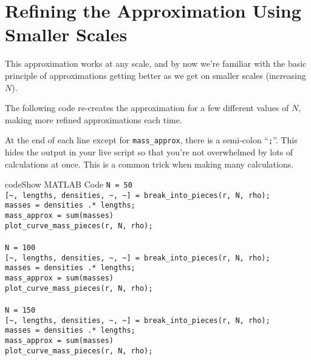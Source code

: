 \documentclass{ximera}
\begin{document}
\section*{Refining the Approximation Using Smaller Scales}

This approximation works at any scale, and by now we're familiar with the basic principle of approximations getting better as we get on smaller scales (increasing $N$).

The following code re-creates the approximation for a few different values of $N$, making more refined approximations each time.

\begin{remark}
At the end of each line except for \texttt{mass\_approx}, there is a semi-colon ``\texttt{;}''. This hides the output in your live script so that you're not overwhelmed by lots of calculations at once. This is a common trick when making many calculations.
\end{remark}

\begin{expandable}{code}{Show MATLAB Code}
\texttt{N = 50}\\
\texttt{[\textasciitilde, lengths, densities, \textasciitilde, \textasciitilde] = break\_into\_pieces(r, N, rho);}\\
\texttt{masses = densities .* lengths;}\\
\texttt{mass\_approx = sum(masses)}\\
\texttt{plot\_curve\_mass\_pieces(r, N, rho);}\\
\\
\texttt{N = 100}\\
\texttt{[\textasciitilde, lengths, densities, \textasciitilde, \textasciitilde] = break\_into\_pieces(r, N, rho);}\\
\texttt{masses = densities .* lengths;}\\
\texttt{mass\_approx = sum(masses)}\\
\texttt{plot\_curve\_mass\_pieces(r, N, rho);}\\
\\
\texttt{N = 150}\\
\texttt{[\textasciitilde, lengths, densities, \textasciitilde, \textasciitilde] = break\_into\_pieces(r, N, rho);}\\
\texttt{masses = densities .* lengths;}\\
\texttt{mass\_approx = sum(masses)}\\
\texttt{plot\_curve\_mass\_pieces(r, N, rho);}
\end{expandable}
\end{document}

